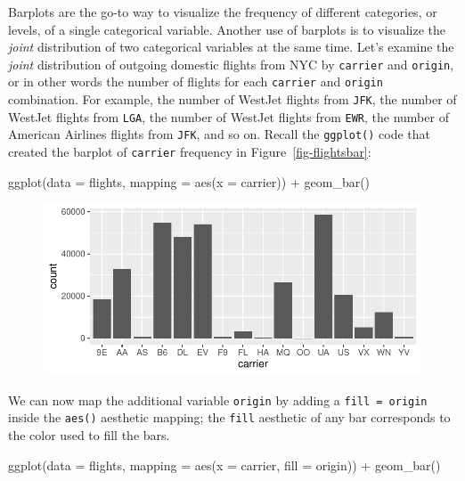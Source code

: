\documentclass[
  letterpaper,
  DIV=11,
  numbers=noendperiod]{scrreprt}
\newenvironment{Shaded}{\begin{snugshade}}{\end{snugshade}}
\newcommand{\AttributeTok}[1]{\textcolor[rgb]{0.40,0.45,0.13}{#1}}
\newcommand{\FunctionTok}[1]{\textcolor[rgb]{0.28,0.35,0.67}{#1}}
\newcommand{\NormalTok}[1]{\textcolor[rgb]{0.00,0.23,0.31}{#1}}
\newcommand{\SpecialCharTok}[1]{\textcolor[rgb]{0.37,0.37,0.37}{#1}}
\theoremstyle{definition}
\theoremstyle{remark}
\begin{document}
Barplots are the go-to way to visualize the frequency of different
categories, or levels, of a single categorical variable. Another use of
barplots is to visualize the \emph{joint} distribution of two
categorical variables at the same time. Let's examine the \emph{joint}
distribution of outgoing domestic flights from NYC by \texttt{carrier}
and \texttt{origin}, or in other words the number of flights for each
\texttt{carrier} and \texttt{origin} combination. For example, the
number of WestJet flights from \texttt{JFK}, the number of WestJet
flights from \texttt{LGA}, the number of WestJet flights from
\texttt{EWR}, the number of American Airlines flights from \texttt{JFK},
and so on. Recall the \texttt{ggplot()} code that created the barplot of
\texttt{carrier} frequency in Figure~\ref{fig-flightsbar}:

\begin{Shaded}
\begin{Highlighting}[]
\FunctionTok{ggplot}\NormalTok{(}\AttributeTok{data =}\NormalTok{ flights, }\AttributeTok{mapping =} \FunctionTok{aes}\NormalTok{(}\AttributeTok{x =}\NormalTok{ carrier)) }\SpecialCharTok{+}
  \FunctionTok{geom\_bar}\NormalTok{()}
\end{Highlighting}
\end{Shaded}

\begin{figure}[H]

{\centering \includegraphics{02-visualization_files/figure-pdf/unnamed-chunk-43-1.pdf}

}

\end{figure}

We can now map the additional variable \texttt{origin} by adding a
\texttt{fill\ =\ origin} inside the \texttt{aes()} aesthetic mapping;
the \texttt{fill} aesthetic of any bar corresponds to the color used to
fill the bars.

\begin{Shaded}
\begin{Highlighting}[]
\FunctionTok{ggplot}\NormalTok{(}\AttributeTok{data =}\NormalTok{ flights, }\AttributeTok{mapping =} \FunctionTok{aes}\NormalTok{(}\AttributeTok{x =}\NormalTok{ carrier, }\AttributeTok{fill =}\NormalTok{ origin)) }\SpecialCharTok{+}
  \FunctionTok{geom\_bar}\NormalTok{()}
\end{Highlighting}
\end{Shaded}
\end{document}
